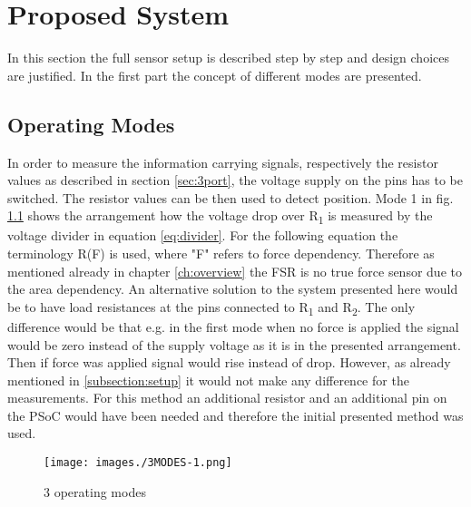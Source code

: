 \chapter{Proposed System}

In this section the full sensor setup is described step by step and design choices are justified. In the first part the concept of different modes are presented.



\section{Operating Modes}

In order to measure the information carrying signals, respectively the resistor values as described in section \ref{sec:3port}, the voltage supply on the pins has to be switched. The resistor values can be then used to detect position. Mode 1 in fig. \ref{fig:operatingmode} shows the arrangement how the voltage drop over R\textsubscript{1} is measured by the voltage divider in equation \ref{eq:divider}. For the following equation the terminology R(F) is used, where "F" refers to force dependency. Therefore as mentioned already in chapter \ref{ch:overview} the FSR is no true force sensor due to the area dependency.\newline
An alternative solution to the system presented here would be to have load resistances at the pins connected to R\textsubscript{1} and R\textsubscript{2}. The only difference would be that e.g. in the first mode when no force is applied the signal would be zero instead of the supply voltage as it is in the presented arrangement. Then if force was applied signal would rise instead of drop. However, as already mentioned in \ref{subsection:setup} it would not make any difference for the measurements. For this method an additional resistor and an additional pin on the PSoC would have been needed and therefore the initial presented method was used.

\begin{figure}[htp]
    \centering
    \texttt{[image: images./3MODES-1.png]}
    \caption[Proposed system overview: System level]{3 operating modes}
    \label{fig:operatingmode}
\end{figure}  





